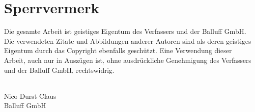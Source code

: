 \thispagestyle{empty}

\section*{Sperrvermerk}

Die gesamte Arbeit ist geistiges Eigentum des Verfassers und der Balluff GmbH. Die verwendeten Zitate und Abbildungen anderer Autoren sind als deren geistiges Eigentum durch das Copyright ebenfalls geschützt. Eine Verwendung dieser Arbeit, auch nur in Auszügen ist, ohne ausdrückliche Genehmigung des Verfassers und der Balluff GmbH, rechtswidrig.

\begin{center}
    \textsuperscript{\textcopyright}\\
    Nico Durst-Claus\\
    Balluff GmbH\\
\end{center}

\cleardoubleemptypage{}